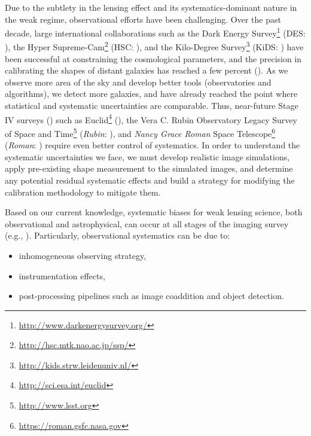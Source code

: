 \documentclass[fleqn,usenatbib]{mnras}
\begin{document}
Due to the subtlety in the lensing effect and its systematics-dominant nature in the weak regime, observational efforts have been challenging. Over the past decade, large international collaborations such as the Dark Energy Survey\footnote{\url{http://www.darkenergysurvey.org/}} (DES: \citealt{2005astro.ph.10346T}), the Hyper Supreme-Cam\footnote{\url{http://hsc.mtk.nao.ac.jp/ssp/}} (HSC: \citealt{2018PASJ...70S...4A}), and the Kilo-Degree Survey\footnote{\url{http://kids.strw.leidenuniv.nl/}} (KiDS: \citealt{2013ExA....35...25D}) have been successful at constraining the cosmological parameters, and the precision in calibrating the shapes of distant galaxies has reached a few percent (\citealt{2020arXiv201103408G, 2020arXiv201208567M, 2021A&A...645A.105G}). As we observe more area of the sky and develop better tools (observatories and algorithms), we detect more galaxies, and have already reached the point where statistical and systematic uncertainties are comparable. Thus, near-future Stage IV surveys (\citealt{2006astro.ph..9591A}) such as Euclid\footnote{\url{ http://sci.esa.int/euclid}} (\citealt{2011arXiv1110.3193L}), the Vera C. Rubin Observatory Legacy Survey of Space and Time\footnote{\url{ http://www.lsst.org}} (\emph{Rubin}: \citealt{2009arXiv0912.0201L, 2019ApJ...873..111I}), and \emph{Nancy Grace Roman} Space Telescope\footnote{\url{https://roman.gsfc.nasa.gov}} (\emph{Roman}: \citealt{2015arXiv150303757S}) require even better control of systematics. In order to understand the systematic uncertainties we face, we must develop realistic image simulations, apply pre-existing shape measurement to the simulated images, and determine any potential residual systematic effects and build a strategy for modifying the calibration methodology to mitigate them.  


Based on our current knowledge, systematic biases for weak lensing science, both observational and astrophysical, can occur at all stages of the imaging survey (e.g., \citealt{2018ARA&A..56..393M}). Particularly, observational systematics can be due to: 
\begin{itemize}
    \item inhomogeneous observing strategy,
    \item instrumentation effects,
    \item post-processing pipelines such as image coaddition and object detection.
\end{itemize} 
\end{document}
